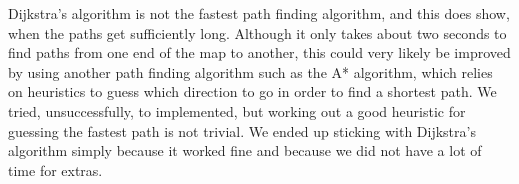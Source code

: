 Dijkstra's algorithm is not the fastest path finding algorithm, and this does show, when the paths get sufficiently long. Although it only takes about two seconds to find paths from one end of the map to another, this could very likely be improved by using another path finding algorithm such as the A* algorithm, which relies on heuristics to guess which direction to go in order to find a shortest path. We tried, unsuccessfully, to implemented, but working out a good heuristic for guessing the fastest path is not trivial. We ended up sticking with Dijkstra's algorithm simply because it worked fine and because we did not have a lot of time for extras.